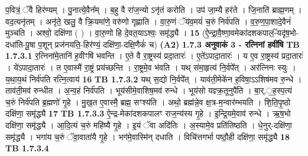 \documentclass[17pt]{extarticle}
\begin{document}
                  प॒वित्रं॒ ॅवै हिर॑ण्यम् । पु॒नात्ये॒वैन᳚म् । ब॒हु वै रा॑ज॒न्यो ऽनृ॑तं करोति । उप॑ जा॒म्यै हर॑ते । जि॒नाति॑ ब्राह्म॒णम् । वद॒त्यनृ॑तम् । अनृ॑ते॒ खलु॒ वै क्रि॒यमा॑णे॒ वरु॑णो गृह्णाति । वा॒रु॒णं ॅय॑व॒मयं॑ च॒रुं निर्व॑पति । व॒रु॒ण॒पा॒शादे॒वैनं॑ मुञ्चति । अश्वो॒ दक्षि॑णा ( ) । वा॒रु॒णो हि दे॒वत॒याऽश्वः॒ समृ॑द्ध्यै । \textbf{ 15} \newline
                  \newline
                                    (ऐ॒न्द्रा॒वै॒ष्णा॒वमेका॑दशकपालं॒-ॅयदृ॑ष॒भो- दधा॑ति-पू॒षा प॒शून् प्रज॑नयति॒-हिर॑ण्यं॒ दक्षि॑णा॒-दक्षि॒णैकं॑ च) \textbf{(A2)} \newline \newline
                \textbf{ 1.7.3     अनुवाकं   3 - रत्निनां हवींषि} \newline
                                \textbf{ TB 1.7.3.1} \newline
                  र॒त्निना॑मे॒तानि॑ ह॒वीꣳषि॑ भवन्ति । ए॒ते वै रा॒ष्ट्रस्य॑ प्रदा॒तारः॑ । ए॒ते॑ऽपादा॒तारः॑ । य ए॒व रा॒ष्ट्रस्य॑ प्रदा॒तारः॑ । ये॑ऽपादा॒तारः॑ । त ए॒वास्मै॑ रा॒ष्ट्रं प्रय॑च्छन्ति । रा॒ष्ट्रमे॒व भ॑वति । यथ् स॑मा॒हृत्य॑ नि॒र्वपे᳚त् । अर॑त्निनः स्युः । य॒था॒य॒थं निर्व॑पति रत्नि॒त्वाय॑ \textbf{ 16} \newline
                  \newline
                                \textbf{ TB 1.7.3.2} \newline
                  यथ् स॒द्यो नि॒र्वपे᳚त् । याव॑ती॒मेके॑न ह॒विषा॒ऽऽशिष॑मव रु॒न्धे । ताव॑ती॒मव॑ रुन्धीत । अ॒न्व॒हं निर्व॑पति । भूय॑सीमे॒वाशिष॒मव॑ रुन्धे । भूय॑सो यज्ञ्क्र॒तूनुपै॑ति । बा॒र्.॒ह॒स्प॒त्यं च॒रुं निर्व॑पति ब्र॒ह्मणो॑ गृ॒हे । मु॒ख॒त ए॒वास्मै॒ ब्रह्म॒ सꣳश्य॑ति । अथो॒ ब्रह्म॑न्ने॒व क्ष॒त्र-म॒न्वार॑म्भयति । शि॒ति॒पृ॒ष्ठो दक्षि॑णा॒ समृ॑द्ध्यै \textbf{ 17} \newline
                  \newline
                                \textbf{ TB 1.7.3.3} \newline
                  ऐ॒न्द्र-मेका॑दशकपालꣳ राज॒न्य॑स्य गृ॒हे । इ॒न्द्रि॒यमे॒वाव॑ रुन्धे । ऋ॒ष॒भो दक्षि॑णा॒ समृ॑द्ध्यै । आ॒दि॒त्यं च॒रुं महि॑ष्यै गृ॒हे । इ॒यं ॅवा अदि॑तिः । अ॒स्यामे॒व प्रति॑तिष्ठति । धे॒नुर्-दक्षि॑णा॒ समृ॑द्ध्यै । भगा॑य च॒रुं ॅवा॒वाता॑यै गृ॒हे । भग॑मे॒वास्मि॑न् दधाति । विचि॑त्तगर्भा पष्ठौ॒ही दक्षि॑णा॒ समृ॑द्ध्यै \textbf{ 18} \newline
                  \newline
                                \textbf{ TB 1.7.3.4} \newline
\end{document}
